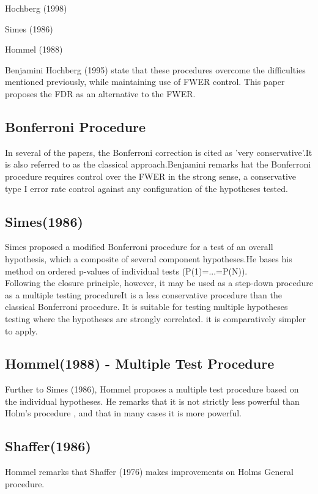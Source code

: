 \documentclass{article}
\begin{document}
\begin{list}{}
	\item Hochberg (1998)
	\item Simes (1986)
	\item Hommel (1988)
\end{list}

Benjamini Hochberg (1995) state that these procedures overcome the
difficulties mentioned previously, while maintaining use of FWER
control. This paper proposes the FDR as an alternative to the
FWER.

\subsection*{Bonferroni Procedure }
In several of the papers, the Bonferroni correction is cited as
'very conservative'.It is also referred to as the classical
approach.Benjamini remarks  hat the Bonferroni procedure requires
control over the FWER in the strong sense, a conservative type I
error rate control against any configuration of the hypotheses
tested.


\subsection*{Simes(1986) }
Simes proposed a modified Bonferroni procedure for a test of an
overall hypothesis, which a composite of several component
hypotheses.He bases his method on ordered p-values of individual
tests (P(1)=...=P(N)). \\Following the closure principle, however,
it may be used as a step-down procedure as a multiple testing
procedureIt is a less conservative procedure than the classical
Bonferroni procedure. It is suitable for testing multiple
hypotheses testing where the hypotheses are strongly correlated.
it is comparatively simpler to apply.

\subsection*{Hommel(1988) - Multiple Test Procedure}
Further to Simes (1986), Hommel proposes a multiple test procedure
based on the individual hypotheses. He remarks that it is not
strictly less powerful than Holm's procedure , and that in many
cases it is more powerful.

\subsection*{Shaffer(1986)}
Hommel remarks that Shaffer (1976) makes improvements on Holms
General procedure.
\end{document}
